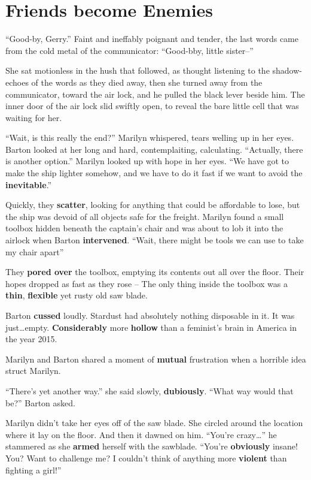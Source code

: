 \section*{Friends become Enemies}

``Good-by, Gerry.''
Faint and ineffably poignant and tender, the last words came from the cold metal
of the communicator:
``Good-bby, little sister--''

She sat motionless in the hush  that  followed,  as  thought  listening  to  the
shadow-echoes of the  words  as  they  died  away, then she turned away from the
communicator, toward the air lock, and he pulled the black lever beside him. The
inner  door of the air lock slid swiftly open, to reveal the  bare  little  cell
that was waiting for her.

``Wait, is this  really  the  end?''  Marilyn whispered, tears welling up in her
eyes.  Barton  looked  at  her  long  and  hard, contemplaiting, calculating.
``Actually, there is  another option.'' Marilyn looked up with hope in her eyes.
``We have got to make the ship lighter somehow, and we have  to do it fast if we
want to avoid the \textbf{inevitable}.''

Quickly, they \textbf{scatter}, looking for anything that could be affordable to
lose, but the ship was devoid of all objects safe for the freight. Marilyn found
a  small toolbox hidden beneath the captain's chair and was about to lob it into
the airlock when Barton \textbf{intervened}.
``Wait,   there   might   be  tools  we  can  use  to  take  my  chair   apart''

They \textbf{pored over} the  toolbox,  emptying  its  contents out all over the
floor. Their hopes dropped as  fast  as  they  rose -- The only thing inside the
toolbox was a \textbf{thin}, \textbf{flexible} yet rusty old saw blade.

Barton \textbf{cussed} loudly. Stardust had absolutely nothing disposable in it.
It  was  just\ldots  empty.  \textbf{Considerably} more  \textbf{hollow}  than a
feminist's brain in America in the year 2015.

Marilyn  and  Barton  shared  a moment of  \textbf{mutual}  frustration  when  a
horrible idea struct Marilyn.

``There's yet another way.'' she said slowly, \textbf{dubiously}.
``What way would that be?'' Barton asked.

Marilyn didn't take  her  eyes  off  of  the  saw  blade. She circled around the
location where it lay on the floor. And then it dawned on him.
``You're  crazy\ldots''  he  stammered as she \textbf{armed}  herself  with  the
sawblade.
``You're \textbf{obviously} insane! You?  Want to challenge me? I couldn't think
of anything more \textbf{violent} than fighting a girl!''

